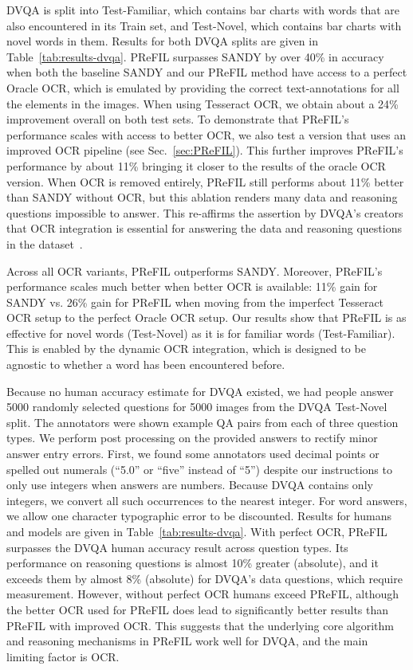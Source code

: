 \documentclass[10pt,twocolumn]{article}
\begin{document}
DVQA is split into Test-Familiar, which contains bar charts with words that are also encountered in its Train set, and Test-Novel, which contains bar charts with novel words in them. Results for both DVQA splits are given in Table~\ref{tab:results-dvqa}. PReFIL surpasses SANDY by over 40\% in accuracy when both the baseline SANDY and our PReFIL method have access to a perfect Oracle OCR, which is emulated by providing the correct text-annotations for all the elements in the images. When using Tesseract OCR, we obtain about a 24\% improvement overall on both test sets. To demonstrate that PReFIL's performance scales with access to better OCR, we also test a version that uses an improved OCR pipeline (see Sec.~\ref{sec:PReFIL}). This further improves PReFIL's performance by about 11\% bringing it closer to the results of the oracle OCR version. When OCR is removed entirely, PReFIL still performs about 11\% better than SANDY without OCR, but this ablation renders many data and reasoning questions impossible to answer.  This re-affirms the assertion by DVQA's creators that OCR integration is essential for answering the data and reasoning questions in the dataset~\cite{kafle2018dvqa}. 

Across all OCR variants, PReFIL outperforms SANDY. Moreover, PReFIL's performance scales much better when better OCR is available: 11\% gain for SANDY vs. 26\% gain for PReFIL when moving from the imperfect Tesseract OCR setup to the perfect Oracle OCR setup. Our results show that PReFIL is as effective for novel words (Test-Novel) as it is for familiar words (Test-Familiar). This is enabled by the dynamic OCR integration, which is designed to be agnostic to whether a word has been encountered before.

Because no human accuracy estimate for DVQA existed, we had people answer 5000 randomly selected questions for 5000 images from the DVQA Test-Novel split. The annotators were shown example QA pairs from each of three question types. We perform post processing on the provided answers to rectify minor answer entry errors. First, we found some annotators used decimal points or spelled out numerals (``5.0'' or ``five'' instead of ``5'') despite our instructions to only use integers when answers are numbers. Because DVQA contains only integers, we convert all such occurrences to the nearest integer. For word answers, we allow one character typographic error to be discounted. Results for humans and models are given in Table~\ref{tab:results-dvqa}. With perfect OCR, PReFIL surpasses the DVQA human accuracy result across question types. Its performance on reasoning questions is  almost 10\%  greater (absolute), and it exceeds them by almost 8\% (absolute) for DVQA's data questions, which require measurement. However, without perfect OCR humans exceed PReFIL, although the better OCR used for PReFIL does lead to significantly better results than PReFIL with improved OCR. This suggests that the underlying core algorithm and reasoning mechanisms in PReFIL work well for DVQA, and the main limiting factor is OCR.
\end{document}

